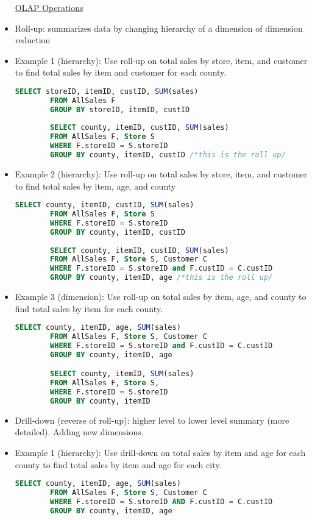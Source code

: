 \documentclass[8pt,landscape,a4paper, fleqn, dvipsnames]{extarticle}
\begin{document}
\begin{multicols*}{4}
\begin{itemize}
    \underline{OLAP Operations}
    \item Roll-up: summarizes data by changing hierarchy of a dimension of dimension reduction 
    \item Example 1 (hierarchy): Use roll-up on total sales by store, item, and customer to find total sales by item and customer for each county.
    \begin{lstlisting}[language=SQL]
        SELECT storeID, itemID, custID, SUM(sales)
        FROM AllSales F
        GROUP BY storeID, itemID, custID
        
        SELECT county, itemID, custID, SUM(sales)
        FROM AllSales F, Store S
        WHERE F.storeID = S.storeID
        GROUP BY county, itemID, custID /*this is the roll up/
    \end{lstlisting}
    \item Example 2 (hierarchy): Use roll-up on total sales by store, item, and customer to find total sales by item, age, and county 
    \begin{lstlisting}[language=SQL]
        SELECT county, itemID, custID, SUM(sales)
        FROM AllSales F, Store S
        WHERE F.storeID = S.storeID
        GROUP BY county, itemID, custID
        
        SELECT county, itemID, custID, SUM(sales)
        FROM AllSales F, Store S, Customer C
        WHERE F.storeID = S.storeID and F.custID = C.custID
        GROUP BY county, itemID, age /*this is the roll up/
    \end{lstlisting}
    \item Example 3 (dimension): Use roll-up on total sales by item, age, and county to find total sales by item for each county. 
    \begin{lstlisting}[language = SQL]
        SELECT county, itemID, age, SUM(sales)
        FROM AllSales F, Store S, Customer C
        WHERE F.storeID = S.storeID and F.custID = C.custID
        GROUP BY county, itemID, age

        SELECT county, itemID, SUM(sales)
        FROM AllSales F, Store S, 
        WHERE F.storeID = S.storeID
        GROUP BY county, itemID 
    \end{lstlisting}
    \item Drill-down (reverse of roll-up):  higher level to lower level summary (more detailed). Adding new dimensions.
    \item Example 1 (hierarchy): Use drill-down on total sales by  item and age for each county to find total sales by item and age for each city.
    \begin{lstlisting}[language=SQL]
        SELECT county, itemID, age, SUM(sales)
        FROM AllSales F, Store S, Customer C
        WHERE F.storeID = S.storeID AND F.custID = C.custID
        GROUP BY county, itemID, age


\end{lstlisting}
\end{itemize}
\end{multicols*}
\end{document}
